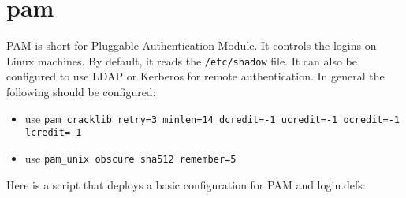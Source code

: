 \section{pam}

PAM is short for Pluggable Authentication Module.
It controls the logins on Linux machines.
By default, it reads the \lstinline|/etc/shadow| file.
It can also be configured to use LDAP or Kerberos for remote authentication.
In general the following should be configured:

\begin{itemize}
	\item use \lstinline|pam_cracklib retry=3 minlen=14 dcredit=-1 ucredit=-1 ocredit=-1 lcredit=-1|
	\item use \lstinline|pam_unix obscure sha512 remember=5|
\end{itemize}

Here is a script that deploys a basic configuration for PAM and login.defs:

